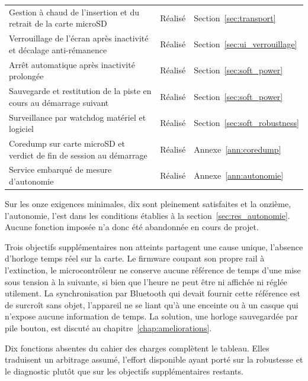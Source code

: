 \begin{longtable}{p{} p{} p{}}
  Gestion à chaud de l'insertion et du retrait de la carte microSD                    & Réalisé       & Section~\ref{sec:transport}                          \\
  Verrouillage de l'écran après inactivité et décalage anti-rémanence                 & Réalisé       & Section~\ref{sec:ui_verrouillage}                    \\
  Arrêt automatique après inactivité prolongée                                        & Réalisé       & Section~\ref{sec:soft_power}                         \\
  Sauvegarde et restitution de la piste en cours au démarrage suivant                 & Réalisé       & Section~\ref{sec:soft_power}                         \\
  Surveillance par watchdog matériel et logiciel                                      & Réalisé       & Section~\ref{sec:soft_robustness}                    \\
  Coredump sur carte microSD et verdict de fin de session au démarrage                & Réalisé       & Annexe~\ref{ann:coredump}                            \\
  Service embarqué de mesure d'autonomie                                              & Réalisé       & Annexe~\ref{ann:autonomie}                           \\
\end{longtable}
\endgroup

Sur les onze exigences minimales, dix sont pleinement satisfaites et la onzième, l'autonomie, l'est dans les conditions établies à la section~\ref{sec:res_autonomie}. Aucune fonction imposée n'a donc été abandonnée en cours de projet.

Trois objectifs supplémentaires non atteints partagent une cause unique, l'absence d'horloge temps réel sur la carte. Le firmware coupant son propre rail à l'extinction, le microcontrôleur ne conserve aucune référence de temps d'une mise sous tension à la suivante, si bien que l'heure ne peut être ni affichée ni réglée utilement. La synchronisation par Bluetooth qui devait fournir cette référence est de surcroît sans objet, l'appareil ne se liant qu'à une enceinte ou à un casque qui n'expose aucune information de temps. La solution, une horloge sauvegardée par pile bouton, est discuté au chapitre~\ref{chap:ameliorations}.

Dix fonctions absentes du cahier des charges complètent le tableau. Elles traduisent un arbitrage assumé, l'effort disponible ayant porté sur la robustesse et le diagnostic plutôt que sur les objectifs supplémentaires restants.